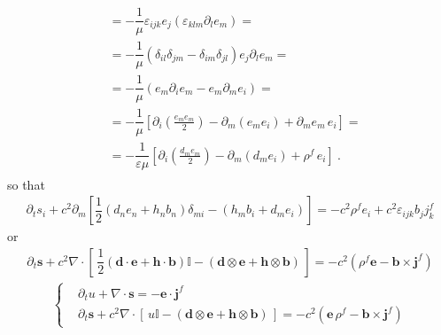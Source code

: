 \documentclass[letterpaper,10pt,italian]{jupyterBook}
\begin{document}
\begin{equation*}
\begin{split}
\begin{aligned}
  & = - \dfrac{1}{\mu} \varepsilon_{ijk} e_j \left( \varepsilon_{klm} \partial_l e_m \right) = \\
  & = - \dfrac{1}{\mu} \left( \delta_{il} \delta_{jm} - \delta_{im} \delta_{jl} \right) e_j \partial_l e_m =  \\
  & = - \dfrac{1}{\mu} \left( e_m \partial_i e_m - e_m \partial_m e_i \right) =  \\
  & = - \dfrac{1}{\mu} \left[ \partial_i \left(\frac{e_m e_m}{2}\right) -  \partial_m \left( e_m e_i \right) + \partial_m e_m \, e_i \right] = \\
  & = - \dfrac{1}{\varepsilon \mu} \left[ \partial_i \left(\frac{d_m e_m}{2}\right) - \partial_m \left( d_m e_i \right) + \rho^f \, e_i \right] \ .
\end{aligned}\end{split}
\end{equation*}
\sphinxAtStartPar
so that
\begin{equation*}
\begin{split}\partial_t s_i + c^2 \partial_m \left[ \dfrac{1}{2}\left( d_n e_n + h_n b_n \right) \delta_{mi} - \left( h_m b_i + d_m e_i \right) \right] = - c^2 \rho^f e_i + c^2 \varepsilon_{ijk} b_j j_k^f \end{split}
\end{equation*}
\sphinxAtStartPar
or
\begin{equation*}
\begin{split}\partial_t \mathbf{s} + c^2 \nabla \cdot \left[ \, \dfrac{1}{2} \left( \mathbf{d} \cdot \mathbf{e} + \mathbf{h} \cdot \mathbf{b} \right) \mathbb{I} - \left( \mathbf{d} \otimes \mathbf{e} + \mathbf{h} \otimes \mathbf{b} \right) \, \right] = - c^2 \left( \rho^f \mathbf{e} - \mathbf{b} \times \mathbf{j}^f \right)\end{split}
\end{equation*}\begin{equation*}
\begin{split}\begin{cases}
& \partial_t u + \nabla \cdot \mathbf{s} = - \mathbf{e} \cdot \mathbf{j}^f \\
& \partial_t \mathbf{s} + c^2 \nabla \cdot \left[ \, u \mathbb{I} - \left( \mathbf{d} \otimes \mathbf{e} + \mathbf{h} \otimes \mathbf{b} \right) \, \right] = - c^2 \left( \mathbf{e} \, \rho^f - \mathbf{b} \times \mathbf{j}^f \right)
\end{cases}\end{split}
\end{equation*}
\sphinxAtStartPar
{} 
\end{document}

